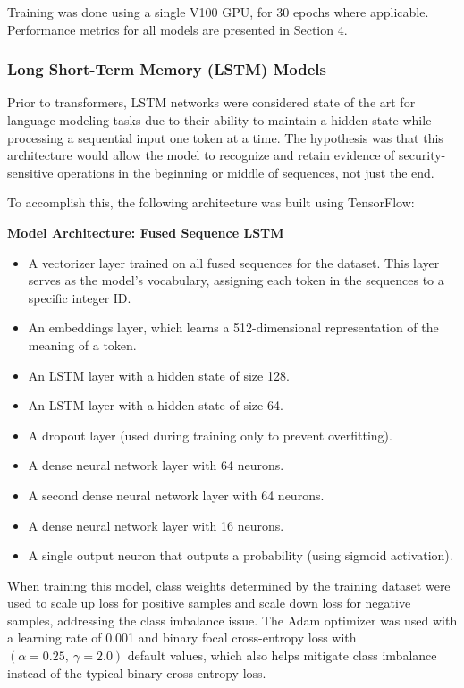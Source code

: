 \documentclass[11pt]{article}
\newenvironment{architecturebox}
  {\par\medskip\noindent\begin{minipage}{\linewidth}\begin{framed}}
  {\end{framed}\end{minipage}\par\medskip}
\begin{document}
Training was done using a single V100 GPU, for 30 epochs where
applicable. Performance metrics for all models are presented in Section 4.

\subsubsection{Long Short-Term Memory (LSTM) Models}\label{long-short-term-memory-lstm-models}

Prior to transformers, LSTM networks were considered state of the art
for language modeling tasks due to their ability to maintain a hidden
state while processing a sequential input one token at a time. The hypothesis was that this architecture would allow the model to recognize and retain evidence of security-sensitive operations in the beginning or middle of sequences, not just the end.

To accomplish this, the following architecture was built using TensorFlow:

\begin{architecturebox}
\noindent\textbf{Model Architecture: Fused Sequence LSTM}

\begin{itemize}
\item
  A vectorizer layer trained on all fused sequences for the dataset.
  This layer serves as the model's vocabulary, assigning each token in
  the sequences to a specific integer ID.
\item
  An embeddings layer, which learns a 512-dimensional representation of
  the meaning of a token.
\item
  An LSTM layer with a hidden state of size 128.
\item
  An LSTM layer with a hidden state of size 64.
\item
  A dropout layer (used during training only to prevent overfitting).
\item
  A dense neural network layer with 64 neurons.
\item
  A second dense neural network layer with 64 neurons.
\item
  A dense neural network layer with 16 neurons.
\item
  A single output neuron that outputs a probability (using sigmoid
  activation).
\end{itemize}
\end{architecturebox}

When training this model, class weights determined by the training
dataset were used to scale up loss for positive samples and scale down
loss for negative samples, addressing the class imbalance issue. The
Adam optimizer was used with a learning rate of 0.001 and binary focal
cross-entropy loss with \((\alpha = 0.25,\ \gamma = 2.0)\) default
values, which also helps mitigate class imbalance instead of the typical
binary cross-entropy loss.
\end{document}
